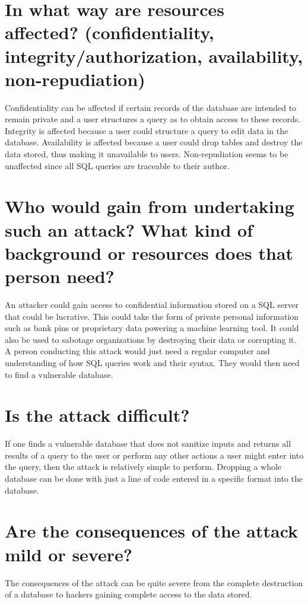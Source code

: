 \documentclass[11pt]{article}
\begin{document}
\section*{In what way are resources affected? (confidentiality, integrity/authorization, availability, non-repudiation)}
Confidentiality can be affected if certain records of the database are intended to remain private and a user structures a query as to obtain access to these records. Integrity is affected because a user could structure a query to edit data in the database. Availability is affected because a user could drop tables and destroy the data stored, thus making it unavailable to users. Non-repudiation seems to be unaffected since all SQL queries are traceable to their author.

\section*{Who would gain from undertaking such an attack? What kind of background or resources does that person need?}
An attacker could gain access to confidential information stored on a SQL server that could be lucrative. This could take the form of private personal information such as bank pins or proprietary data powering a machine learning tool. It could also be used to sabotage organizations by destroying their data or corrupting it. A person conducting this attack would just need a regular computer and understanding of how SQL queries work and their syntax. They would then need to find a vulnerable database.

\section*{Is the attack difficult?}
If one finds a vulnerable database that does not sanitize inputs and returns all results of a query to the user or perform any other actions a user might enter into the query, then the attack is relatively simple to perform. Dropping a whole database can be done with just a line of code entered in a specific format into the database.

\section*{Are the consequences of the attack mild or severe?}
The consequences of the attack can be quite severe from the complete destruction of a database to hackers gaining complete access to the data stored. 
\end{document}
